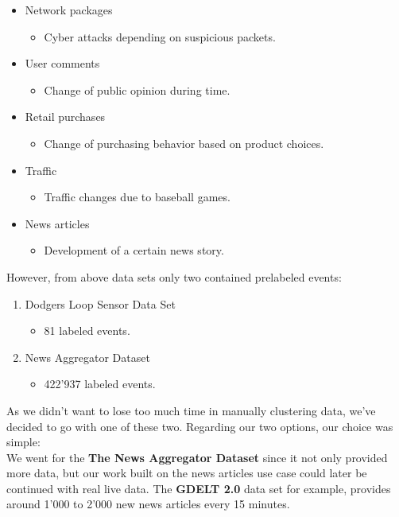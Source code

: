 \begin{itemize}
    \item Network packages
        \begin{itemize}
            \item Cyber attacks depending on suspicious packets.
        \end{itemize}
    \item User comments
        \begin{itemize}
            \item Change of public opinion during time.
        \end{itemize}
    \item Retail purchases
        \begin{itemize}
            \item Change of purchasing behavior based on product choices.
        \end{itemize}
    \item Traffic
        \begin{itemize}
            \item Traffic changes due to baseball games.
        \end{itemize}
    \item News articles
        \begin{itemize}
            \item Development of a certain news story.
        \end{itemize}
\end{itemize}

However, from above data sets only two contained prelabeled events:

\begin{enumerate}
    \item Dodgers Loop Sensor Data Set
        \begin{itemize}
            \item 81 labeled events. %
        \end{itemize}
    \item News Aggregator Dataset
        \begin{itemize}
            \item 422'937 labeled events. %
        \end{itemize}
\end{enumerate}

As we didn't want to lose too much time in manually clustering data, we've decided to go with one of these two.
Regarding our two options, our choice was simple:\\
We went for the \textbf{The News Aggregator Dataset} since it not only provided more data,
but our work built on the news articles use case could later be continued with real live data.
The \textbf{GDELT 2.0} data set for example, provides around 1'000 to 2'000 new news articles every 15 minutes.

